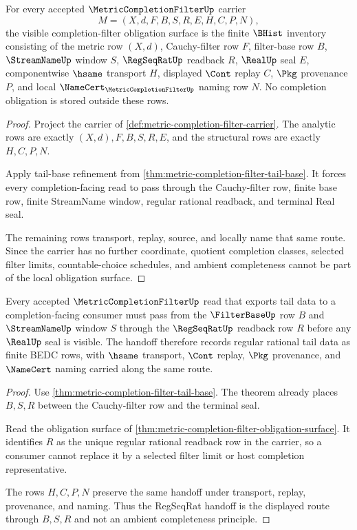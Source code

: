 \begin{theorem}
\label{thm:metric-completion-filter-obligation-surface}
For every accepted $\MetricCompletionFilterUp$ carrier
$$
M=(X,d,F,B,S,R,E,H,C,P,N),
$$
the visible completion-filter obligation surface is the finite $\BHist$ inventory consisting of the metric row $(X,d)$, Cauchy-filter row $F$, filter-base row $B$, $\StreamNameUp$ window $S$, $\RegSeqRatUp$ readback $R$, $\RealUp$ seal $E$, componentwise $\hsame$ transport $H$, displayed $\Cont$ replay $C$, $\Pkg$ provenance $P$, and local $\NameCert_{\MetricCompletionFilterUp}$ naming row $N$. No completion obligation is stored outside these rows.
\end{theorem}
\begin{proof}
Project the carrier of \autoref{def:metric-completion-filter-carrier}. The analytic rows are exactly $(X,d),F,B,S,R,E$, and the structural rows are exactly $H,C,P,N$.

Apply tail-base refinement from \autoref{thm:metric-completion-filter-tail-base}. It forces every completion-facing read to pass through the Cauchy-filter row, finite base row, finite StreamName window, regular rational readback, and terminal Real seal.

The remaining rows transport, replay, source, and locally name that same route. Since the carrier has no further coordinate, quotient completion classes, selected filter limits, countable-choice schedules, and ambient completeness cannot be part of the local obligation surface.
\end{proof}

\begin{theorem}
\label{thm:metric-completion-filter-regseqrat-handoff}
Every accepted $\MetricCompletionFilterUp$ read that exports tail data to a completion-facing consumer must pass from the $\FilterBaseUp$ row $B$ and $\StreamNameUp$ window $S$ through the $\RegSeqRatUp$ readback row $R$ before any $\RealUp$ seal is visible. The handoff therefore records regular rational tail data as finite BEDC rows, with $\hsame$ transport, $\Cont$ replay, $\Pkg$ provenance, and $\NameCert$ naming carried along the same route.
\end{theorem}
\begin{proof}
Use \autoref{thm:metric-completion-filter-tail-base}. The theorem already places $B,S,R$ between the Cauchy-filter row and the terminal seal.

Read the obligation surface of \autoref{thm:metric-completion-filter-obligation-surface}. It identifies $R$ as the unique regular rational readback row in the carrier, so a consumer cannot replace it by a selected filter limit or host completion representative.

The rows $H,C,P,N$ preserve the same handoff under transport, replay, provenance, and naming. Thus the RegSeqRat handoff is the displayed route through $B,S,R$ and not an ambient completeness principle.
\end{proof}

